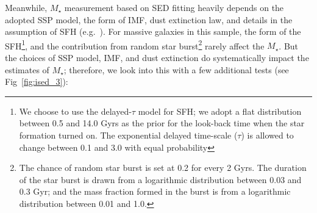 \documentclass[fleqn,usenatbib]{mnras}
\def\mstar{{$M_{\star}$}}
\begin{document}
    Meanwhile, \mstar{} measurement based on SED fitting heavily depends on the 
    adopted SSP model, the form of IMF, dust extinction law, and details in 
    the assumption of SFH (e.g.\ \citealt{Bernardi2017}). 
    For massive galaxies in this sample, the form of the SFH\footnote{We choose 
    to use the delayed-$\tau$ model for SFH; we adopt a flat distribution between 
    0.5 and 14.0 Gyrs as the prior for the look-back time when the star formation 
    turned on. 
    The exponential delayed time-scale ($\tau$) is allowed to change between 
    0.1 and 3.0 with equal probability}, and the contribution from random star 
    burst\footnote{The chance of random star burst is set at 0.2 for every 2 Gyrs. 
    The duration of the star burst is drawn from a logarithmic distribution 
    between 0.03 and 0.3 Gyr; and the mass fraction formed in the burst is from 
    a logarithmic distribution between 0.01 and 1.0.} rarely affect the \mstar{}. 
    But the choices of SSP model, IMF, and dust extinction do systematically impact
    the estimates of \mstar{}; therefore, we look into this with a few 
    additional tests (see Fig~\ref{fig:ised_3}):
\end{document}
